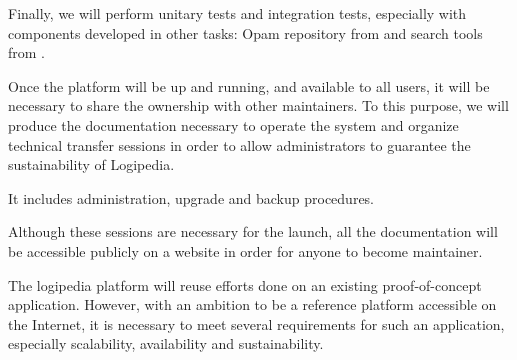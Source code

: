 \begin{workpackage}[id=access,type=RTD,wphases=1-48,
  short=Access,%
  title={Access},
  lead=Inr,InrRM=48,OcaRM=6,EduRM=12]
\begin{tasklist}
{\begin{task}[id=web,
      title=Giving access to the infrastructure on the world-wide web,
      shorttitle=Giving access to the infrastructure on the world-wide web,
      lead=Inr,InrRM=18,,wphases=8-27]
    Finally, we will perform unitary tests and integration tests,
    especially with components developed in other tasks: Opam
    repository from  and search tools from
    .
  \end{task}

  \begin{task}[id=transfer,
      title=Transfer for the sustainability of the system,
      shorttitle=Transfer for the sustainability of the system,
      lead=Inr,InrRM=1,wphases=28-29]
    Once the platform will be up and running, and available to all
    users, it will be necessary to share the ownership with other
    maintainers. To this purpose, we will produce the documentation
    necessary to operate the system and organize technical transfer
    sessions in order to allow administrators to guarantee the
    sustainability of Logipedia.

    It includes administration, upgrade and backup procedures.

    Although these sessions are necessary for the launch, all the
    documentation will be accessible publicly on a website in order
    for anyone to become maintainer.
  \end{task}
  }

  \begin{task}[id=archi,
      title=Setting up the hardware and software architecture,
      shorttitle=Setting up the hardware and software architecture,
      lead=Inr,InrRM=6,wphases=1-6]
    The logipedia platform will reuse efforts done on an existing
    proof-of-concept application. However, with an ambition to be a
    reference platform accessible on the Internet, it is necessary to meet
    several requirements for such an application, especially
    scalability, availability and sustainability.


\end{task}
\end{tasklist}
\end{workpackage}
